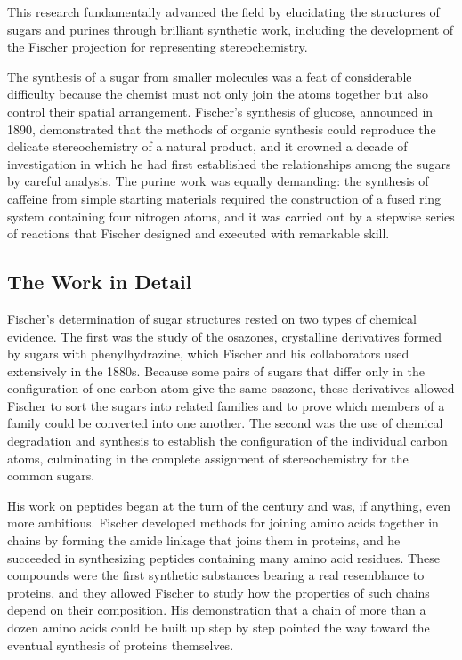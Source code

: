 This research fundamentally advanced the field by elucidating the structures of sugars and purines through brilliant synthetic work, including the development of the Fischer projection for representing stereochemistry.

The synthesis of a sugar from smaller molecules was a feat of considerable difficulty because the chemist must not only join the atoms together but also control their spatial arrangement. Fischer's synthesis of glucose, announced in 1890, demonstrated that the methods of organic synthesis could reproduce the delicate stereochemistry of a natural product, and it crowned a decade of investigation in which he had first established the relationships among the sugars by careful analysis. The purine work was equally demanding: the synthesis of caffeine from simple starting materials required the construction of a fused ring system containing four nitrogen atoms, and it was carried out by a stepwise series of reactions that Fischer designed and executed with remarkable skill.

\subsection*{The Work in Detail}

Fischer's determination of sugar structures rested on two types of chemical evidence. The first was the study of the osazones, crystalline derivatives formed by sugars with phenylhydrazine, which Fischer and his collaborators used extensively in the 1880s. Because some pairs of sugars that differ only in the configuration of one carbon atom give the same osazone, these derivatives allowed Fischer to sort the sugars into related families and to prove which members of a family could be converted into one another. The second was the use of chemical degradation and synthesis to establish the configuration of the individual carbon atoms, culminating in the complete assignment of stereochemistry for the common sugars.

His work on peptides began at the turn of the century and was, if anything, even more ambitious. Fischer developed methods for joining amino acids together in chains by forming the amide linkage that joins them in proteins, and he succeeded in synthesizing peptides containing many amino acid residues. These compounds were the first synthetic substances bearing a real resemblance to proteins, and they allowed Fischer to study how the properties of such chains depend on their composition. His demonstration that a chain of more than a dozen amino acids could be built up step by step pointed the way toward the eventual synthesis of proteins themselves.

